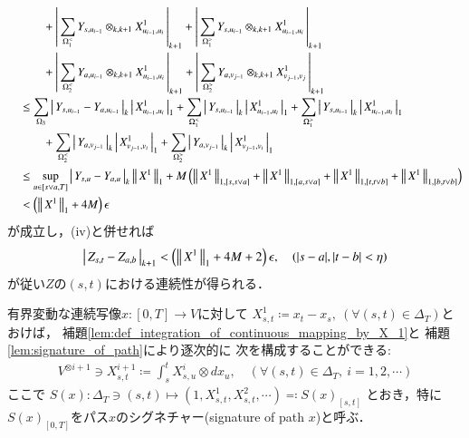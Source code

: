 \begin{prf}
\begin{description}
\begin{align}
					&\quad\qquad + \left|\, \sum_{\Omega_1^<} Y_{s,u_{i-1}} \otimes_{k,k+1} X^1_{u_{i-1},u_i}\, \right|_{k+1} 
					+ \left|\, \sum_{\Omega_1^>} Y_{s,u_{i-1}} \otimes_{k,k+1} X^1_{u_{i-1},u_i}\, \right|_{k+1} \\
					&\quad\qquad + \left|\, \sum_{\Omega_2^<} Y_{a,u_{i-1}} \otimes_{k,k+1} X^1_{u_{i-1},u_i}\, \right|_{k+1} 
					+ \left|\, \sum_{\Omega_2^>} Y_{a,v_{j-1}} \otimes_{k,k+1} X^1_{v_{j-1},v_j}\, \right|_{k+1} \\
					&\quad\leq \sum_{\Omega_3} \left|\, Y_{s,u_{i-1}} - Y_{a,u_{i-1}}\, \right|_{k}
					\left|\, X^1_{u_{i-1},u_i}\, \right|_{1}
					+ \sum_{\Omega_1^<} \left|\, Y_{s,u_{i-1}}\, \right|_{k}
						\left|\, X^1_{u_{i-1},u_i}\, \right|_{1}
					+ \sum_{\Omega_1^>} \left|\, Y_{s,u_{i-1}}\, \right|_{k}
						\left|\, X^1_{u_{i-1},u_i}\, \right|_{1} \\
					&\quad\qquad + \sum_{\Omega_2^<} \left|\, Y_{a,v_{j-1}}\, \right|_{k}
						\left|\, X^1_{v_{j-1},v_i}\, \right|_{1} 
					+ \sum_{\Omega_2^>} \left|\, Y_{a,v_{j-1}}\, \right|_{k}
						\left|\, X^1_{v_{j-1},v_i}\, \right|_{1} \\
					&\quad\leq \operatorname*{sup}_{u \in [s \vee a, T]} \left|\, Y_{s,u} - Y_{a,u}\, \right|_{k}
						\left\|\, X^1\, \right\|_{1}
						+ M \left( \left\|\, X^1\, \right\|_{1,[s,s \vee a]}
						+ \left\|\, X^1\, \right\|_{1,[a,s \vee a]} 
						+ \left\|\, X^1\, \right\|_{1,[t,t \vee b]} 
						+ \left\|\, X^1\, \right\|_{1,[b,t \vee b]} \right) \\
					&\quad< \left( \left\|\, X^1\, \right\|_{1} + 4 M \right) \epsilon 
				\end{align}
				が成立し，(iv)と併せれば
				\begin{align}
					\left|\, Z_{s,t} - Z_{a,b}\, \right|_{k+1} 
					< \left( \left\|\, X^1\, \right\|_{1} + 4 M + 2\right)\epsilon,
					\quad (|s-a|,|t-b| < \eta)
				\end{align}
				が従い$Z$の$(s,t)$における連続性が得られる．
				\QED
		\end{description}	
	\end{prf}
	
	\begin{screen}
		\begin{dfn}[パスのシグネチャー]
			有界変動な連続写像$x:[0,T] \longrightarrow V$に対して
			$X^1_{s,t} \coloneqq x_t-x_s,\ (\forall (s,t) \in \Delta_T)$とおけば，
			補題\ref{lem:def_integration_of_continuous_mapping_by_X_1}と
			補題\ref{lem:signature_of_path}により逐次的に
			次を構成することができる:
			\begin{align}
				V^{\otimes i+1} \ni X^{i+1}_{s,t} \coloneqq \int_s^t X^i_{s,u} \otimes dx_u,
				\quad (\forall (s,t) \in \Delta_T,\ i=1,2,\cdots)
				\label{eq:def_signature_of_path}
			\end{align}
			ここで
			$S(x):\Delta_T \ni (s,t) \longmapsto 
			(1,X^1_{s,t},X^2_{s,t},\cdots) \eqqcolon S(x)_{[s,t]}$
			とおき，特に$S(x)_{[0,T]}$をパス$x$のシグネチャー(signature of path $x$)と呼ぶ．
		\end{dfn}
	\end{screen}
	
